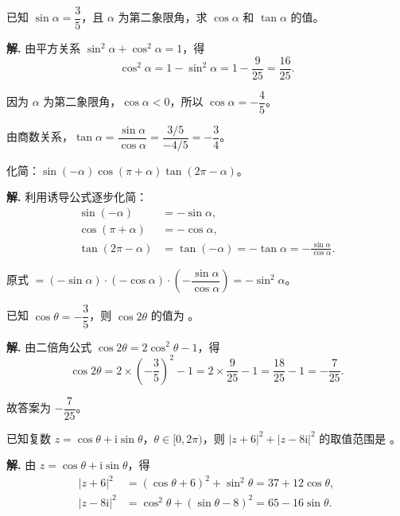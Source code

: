 \documentclass[11pt]{ctexrep}
\begin{document}
\begin{example}[同角三角比求值]
    已知 $\sin\alpha = \dfrac{3}{5}$，且 $\alpha$ 为第二象限角，求 $\cos\alpha$ 和 $\tan\alpha$ 的值。
\end{example}

\textbf{解.} 由平方关系 $\sin^2\alpha + \cos^2\alpha = 1$，得
\[
    \cos^2\alpha = 1 - \sin^2\alpha = 1 - \frac{9}{25} = \frac{16}{25}.
\]

因为 $\alpha$ 为第二象限角，$\cos\alpha < 0$，所以 $\cos\alpha = -\dfrac{4}{5}$。

由商数关系，$\tan\alpha = \dfrac{\sin\alpha}{\cos\alpha} = \dfrac{3/5}{-4/5} = -\dfrac{3}{4}$。

\begin{example}[诱导公式的应用]
    化简：$\sin(-\alpha)\cos(\pi + \alpha)\tan(2\pi - \alpha)$。
\end{example}

\textbf{解.} 利用诱导公式逐步化简：
\begin{align*}
    \sin(-\alpha) &= -\sin\alpha, \\
    \cos(\pi + \alpha) &= -\cos\alpha, \\
    \tan(2\pi - \alpha) &= \tan(-\alpha) = -\tan\alpha = -\frac{\sin\alpha}{\cos\alpha}.
\end{align*}

原式 $= (-\sin\alpha) \cdot (-\cos\alpha) \cdot \left(-\dfrac{\sin\alpha}{\cos\alpha}\right) = -\sin^2\alpha$。

\begin{realexam}[2026 崇明高三二模]
    已知 $\cos\theta = -\dfrac{3}{5}$，则 $\cos 2\theta$ 的值为 \underline{\hspace{2cm}}。
\end{realexam}

\textbf{解.} 由二倍角公式 $\cos 2\theta = 2\cos^2\theta - 1$，得
\[
    \cos 2\theta = 2 \times \left(-\frac{3}{5}\right)^2 - 1 = 2 \times \frac{9}{25} - 1 = \frac{18}{25} - 1 = -\frac{7}{25}.
\]

故答案为 $-\dfrac{7}{25}$。

\begin{realexam}[2025 浦东高三一模]
    已知复数 $z = \cos\theta + \mathrm{i}\sin\theta$，$\theta \in [0, 2\pi)$，则 $|z + 6|^2 + |z - 8\mathrm{i}|^2$ 的取值范围是 \underline{\hspace{2cm}}。
\end{realexam}

\textbf{解.} 由 $z = \cos\theta + \mathrm{i}\sin\theta$，得
\begin{align*}
    |z + 6|^2 &= (\cos\theta + 6)^2 + \sin^2\theta = 37 + 12\cos\theta, \\
    |z - 8\mathrm{i}|^2 &= \cos^2\theta + (\sin\theta - 8)^2 = 65 - 16\sin\theta.
\end{align*}
\end{document}
